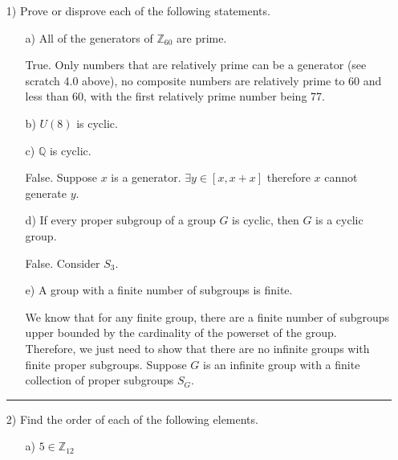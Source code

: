 \documentclass[11pt]{article}
\begin{document}
\begin{itemize}
    \item[1)] Prove or disprove each of the following statements.
    \begin{itemize}
        \item [a)]All of the generators of $\mathbb{Z}_{60}$ are prime.
        \begin{solution}
            True. Only numbers that are relatively prime can be a generator (see scratch 4.0 above), no composite numbers are relatively prime to 60 and less than 60, with the first relatively prime number being 77.
        \end{solution}
        \item [b)] $U(8)$ is cyclic.
        \item [c)]$\mathbb{Q}$ is cyclic.
        \begin{solution}
            False. Suppose $x$ is a generator. $\exists y\in [x,x+x]$ therefore $x$ cannot generate $y$.
        \end{solution}
        \item [d)]If every proper subgroup of a group $G$ is cyclic, then $G$ is a cyclic group.
        \begin{solution}
            False. Consider $S_3$.
        \end{solution}
        \item [e)]A group with a finite number of subgroups is finite.
        \begin{solution}
            We know that for any finite group, there are a finite number of subgroups upper bounded by the cardinality of the powerset of the group.\\
            Therefore, we just need to show that there are no infinite groups with finite proper subgroups. Suppose $G$ is an infinite group with a finite collection of proper subgroups $S_G$.
        \end{solution}
    \end{itemize}
    \vspace{6pt}
    \hrule
    \vspace{6pt}
    \item[2)] Find the order of each of the following elements.
    \begin{itemize}
        \item[a)] $5\in \mathbb{Z}_{12}$

\end{itemize}
\end{itemize}
\end{document}
